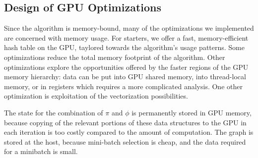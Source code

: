 
\subsection{Design of GPU Optimizations}


Since the algorithm is memory-bound, many of the optimizations we implemented
are concerned with
memory usage. For starters, we offer a fast, memory-efficient hash table on the GPU,
taylored towards
the algorithm's usage patterns. Some optimizations reduce the total memory
footprint of the algorithm. Other
optimizations explore the opportunities offered by the faster regions of the
GPU memory hierarchy: data can be put into GPU shared memory, into thread-local
memory, or in registers which requires a more complicated analysis. One
other optimization is exploitation of the vectorization possibilities.

The state for the combination of $\pi$ and $\phi$ is permanently
stored in GPU memory, because copying of the relevant portions of these
data structures to the GPU in each iteration is too costly compared to the amount
of computation. The graph is stored at the host, because mini-batch
selection is cheap, and the data required for a minibatch is small.

